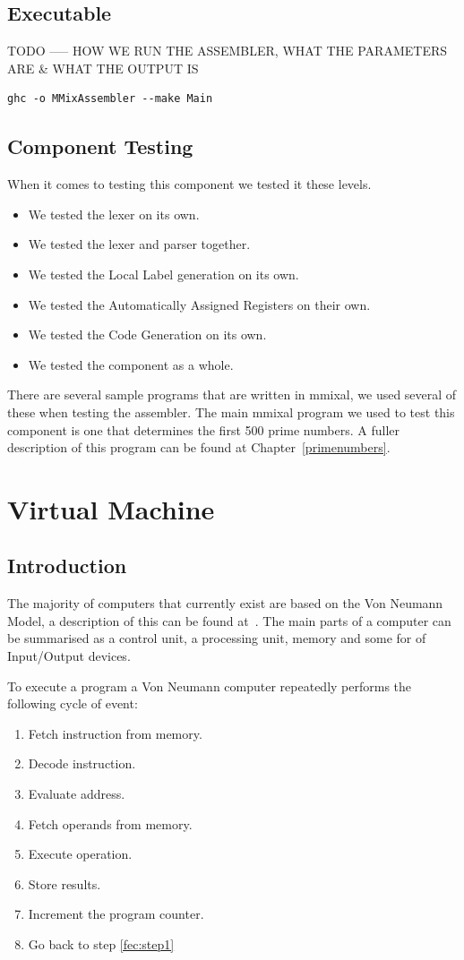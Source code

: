 \documentclass[a4paper,11pt]{report}
\begin{document}
\section{Executable}
TODO ----- HOW WE RUN THE ASSEMBLER, WHAT THE PARAMETERS ARE \& WHAT THE OUTPUT IS

\begin{lstlisting}
ghc -o MMixAssembler --make Main
\end{lstlisting}

\section{Component Testing}
When it comes to testing this component we tested it these levels.
\begin{itemize}
\item We tested the lexer on its own.
\item We tested the lexer and parser together.
\item We tested the Local Label generation on its own.
\item We tested the Automatically Assigned Registers on their own.
\item We tested the Code Generation on its own.
\item We tested the component as a whole.
\end{itemize}

There are several sample programs that are written in mmixal, we used several of these when testing the assembler. The main mmixal program we used to test this component is one that determines the first 500 prime numbers. A fuller description of this program can be found at Chapter~\ref{primenumbers}.
\chapter{Virtual Machine}\label{VM}
\section{Introduction}
The majority of computers that currently exist are based on the Von Neumann Model, a description of this can be found at~\cite{vnmodel}. The main parts of a computer can be summarised as a control unit, a processing unit, memory and some for of Input/Output devices.

To execute a program a Von Neumann computer repeatedly performs the following cycle of event:
\begin{enumerate}
\item Fetch instruction from memory.\label{fec:step1}
\item Decode instruction.
\item Evaluate address.
\item Fetch operands from memory.
\item Execute operation.
\item Store results.
\item Increment the program counter.
\item Go back to step \ref{fec:step1}
\end{enumerate}
\end{document}
